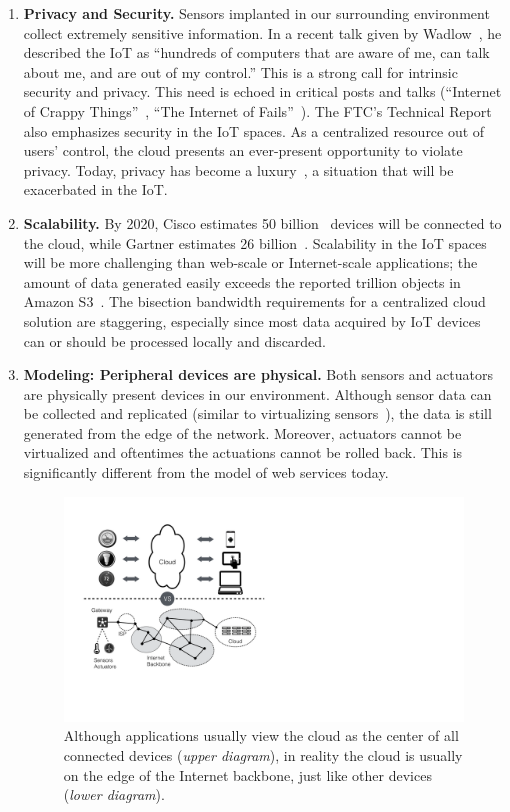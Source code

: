 \begin{enumerate}

\item \textbf{Privacy and Security.} Sensors implanted in our surrounding
  environment collect extremely sensitive information.  In a recent talk given
  by Wadlow~\cite{wadlow}, he described the IoT as ``hundreds of computers that
  are aware of me, can talk about me, and are out of my control.''  This is a
  strong call for intrinsic security and privacy.  This need is echoed in
  critical posts and talks (``Internet of Crappy
  Things''~\cite{alex2015internet}, ``The Internet of
  Fails''~\cite{stanislav2014the}).  The FTC's Technical
  Report~\cite{ftc2015internet} also emphasizes security in the IoT spaces.  As
  a centralized resource out of users' control, the cloud presents an
  ever-present opportunity to violate privacy.  Today, privacy has become a
  luxury~\cite{angwin2014has}, a situation that will be exacerbated in the IoT.

\item \textbf{Scalability.} By 2020, Cisco estimates 50
  billion~\cite{evans2011internet} devices will be connected to the cloud, while
  Gartner estimates 26 billion~\cite{middleton2013forecast}. Scalability in the
  IoT spaces will be more challenging than web-scale or Internet-scale
  applications; the amount of data generated easily exceeds the reported
  trillion objects in Amazon S3~\cite{barr2013amazon}. The bisection bandwidth
  requirements for a centralized cloud solution are staggering, especially since
  most data acquired by IoT devices can or should be processed locally and
  discarded.

\item \textbf{Modeling: Peripheral devices are physical.}  Both sensors and
  actuators are physically present devices in our environment.  Although sensor
  data can be collected and replicated (similar to virtualizing
  sensors~\cite{yuriyama2010sensor}), the data is still generated from the edge
  of the network.  Moreover, actuators cannot be virtualized and oftentimes the
  actuations cannot be rolled back.  This is significantly different from the
  model of web services today.

\begin{figure}
  \centering
  \includegraphics[width=0.6\columnwidth]{figures/cloud-view.pdf}
  \caption{Although applications usually view the cloud as the center of
    all connected devices (\textit{upper diagram}), in reality the cloud
    is usually on the edge of the Internet backbone, just like other
    devices (\textit{lower diagram}).}
  \label{fig:network}
\end{figure}


\end{enumerate}
